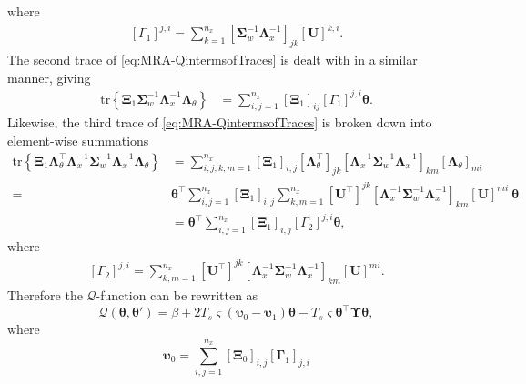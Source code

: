 \documentclass[review,authoryear,3p]{elsarticle}
\begin{document}
where
\begin{align}
\left[ \Gamma_1\right]^{j,i} =\sum_{k=1}^{n_x}\left[ \boldsymbol\Sigma_w^{-1}\boldsymbol\Lambda_x^{-1}\right]_{jk} \left[ \mathbf U\right]^{k,i}.
\end{align}
The second trace of \eqref{eq:MRA-QintermsofTraces} is dealt with in a similar manner, giving
\begin{align}
\mathrm{tr} \left\lbrace \boldsymbol \Xi_1\boldsymbol\Sigma_w^{-1}\boldsymbol\Lambda_x^{-1}\boldsymbol\Lambda_{\theta}\right\rbrace&=
\sum_{i,j=1}^{n_x}\left[ \boldsymbol\Xi_1\right]_{ij}\left[ \Gamma_1\right] ^{j,i}\boldsymbol\theta.
\end{align}
Likewise, the third trace of \eqref{eq:MRA-QintermsofTraces} is broken down into element-wise summations
\begin{align}
\mathrm{tr} \left\lbrace \boldsymbol\Xi_1 \boldsymbol\Lambda_{\theta}^\top\boldsymbol\Lambda_x^{-1}\boldsymbol\Sigma_w^{-1}\boldsymbol\Lambda_x^{-1}\boldsymbol\Lambda_{\theta}\right\rbrace&=\sum_{i,j,k,m=1}^{n_x}\left[\boldsymbol\Xi_1\right] _{i,j}[\boldsymbol\Lambda_{\theta}^{\top}]_{jk} \left[\boldsymbol\Lambda_x^{-1}\boldsymbol\Sigma_w^{-1}\boldsymbol\Lambda_x^{-1} \right]_{km}[\boldsymbol\Lambda_{\theta}]_{mi} \nonumber \\
=&\boldsymbol\theta^\top\sum_{i,j=1}^{n_x}\left[\boldsymbol\Xi_1\right] _{i,j}\sum_{k,m=1}^{n_x}[\mathbf U^{\top}]^{jk} \left[\boldsymbol\Lambda_x^{-1}\boldsymbol\Sigma_w^{-1}\boldsymbol\Lambda_x^{-1} \right]_{km}[\mathbf U]^{mi}~\boldsymbol\theta \nonumber \\
&=\boldsymbol\theta^\top\sum_{i,j=1}^{n_x}\left[\boldsymbol\Xi_1\right] _{i,j}\left[ \Gamma_2\right] ^{j,i}\boldsymbol\theta,
\end{align}
where
\begin{align}
\left[ \Gamma_2\right] ^{j,i}=\sum_{k,m=1}^{n_x}[\mathbf U^{\top}]^{jk} \left[\boldsymbol\Lambda_x^{-1}\boldsymbol\Sigma_w^{-1}\boldsymbol\Lambda_x^{-1} \right]_{km}[\mathbf U]^{mi}.
\end{align}
Therefore the $\mathcal Q$-function can be rewritten as
\begin{equation}\label{eq:MRA-QCompact}
\mathcal Q\left(\boldsymbol \theta,\boldsymbol\theta'\right)=\beta+2T_s\varsigma\left(\boldsymbol\upsilon_0-\boldsymbol\upsilon_1\right)\boldsymbol\theta-T_s\varsigma\boldsymbol\theta^\top\boldsymbol\Upsilon\boldsymbol\theta,
\end{equation}
where
\begin{equation}\label{eq:epsilon0}
\boldsymbol\upsilon_0=\sum_{i,j=1}^{n_x}[\boldsymbol\Xi_0]_{i,j}[\boldsymbol\Gamma_1]_{j,i}
\end{equation}
\end{document}
